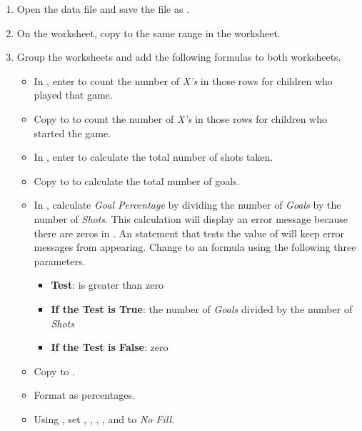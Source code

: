 \begin{enumbox}
	\begin{enumerate}
		\item Open the data file  and save the file as .
		\item On the  worksheet, copy  to the same range in the  worksheet.
		\item Group the worksheets and add the following formulas to both worksheets.
	
		\begin{itemize}
			\item In , enter  to count the number of \textit{X's} in those rows for children who played that game.
			\item Copy  to  to count the number of \textit{X's} in those rows for children who started the game.
			\item In , enter  to calculate the total number of shots taken. 
			\item Copy  to  to calculate the total number of goals.
			\item In , calculate \textit{Goal Percentage} by dividing the number of \textit{Goals} by the number of \textit{Shots}. This calculation will display an error message because there are zeros in . An  statement that tests the value of  will keep error messages from appearing. Change  to an  formula using the following three parameters.
			\begin{itemize}
				\item \textbf{Test}: is  greater than zero
				\item \textbf{If the Test is True}: the number of \textit{Goals} divided by the number of \textit{Shots}
				\item \textbf{If the Test is False}: zero
			\end{itemize}
			\item Copy  to .
			\item Format  as percentages.
			\item Using , set , , , , and  to \textit{No Fill}. 
			\end{itemize}	
		

\end{enumerate}
\end{enumbox}
